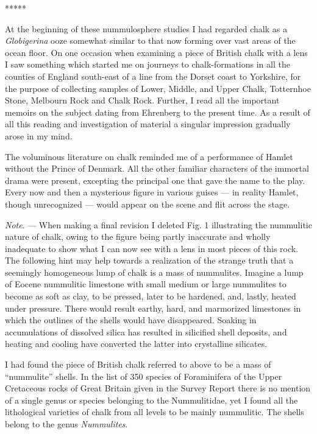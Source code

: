 \documentclass[a4paper, 12pt, oneside]{article}
\begin{document}
\centerline{*\hspace{15mm}*\hspace{15mm}*\hspace{15mm}*\hspace{15mm}*}
\bigskip

At the beginning of these nummulosphere studies I had regarded chalk as a \emph{Globigerina} ooze somewhat similar to that now forming over vast areas of the ocean floor. On one occasion when examining a piece of British chalk with a lens I saw something which started me on journeys to chalk-formations in all the counties of England south-east of a line from the Dorset coast to Yorkshire, for the purpose of collecting samples of Lower, Middle, and Upper Chalk, Totternhoe Stone, Melbourn Rock and Chalk Rock. Further, I read all the important memoirs on the subject dating from Ehrenberg to the present time. As a result of all this reading and investigation of material a singular impression gradually arose in my mind.

The voluminous literature on chalk reminded me of a performance of Hamlet without the Prince of Denmark. All the other familiar characters of the immortal drama were present, excepting the principal one that gave the name to the play. Every now and then a mysterious figure in various guises --- in reality Hamlet, though unrecognized --- would appear on the scene and flit across the stage.

\emph{Note}. --- When making a final revision I deleted Fig. 1 illustrating the nummulitic nature of chalk, owing to the figure being partly inaccurate and wholly inadequate to show what I can now see with a lens in most pieces of this rock. The following hint may help towards a realization of the strange truth that a seemingly homogeneous lump of chalk is a mass of nummulites. Imagine a lump of Eocene nummulitic limestone with small medium or large nummulites to become as soft as clay, to be pressed, later to be hardened, and, lastly, heated under pressure. There would result earthy, hard, and marmorized limestones in which the outlines of the shells would have disappeared. Soaking in accumulations of dissolved silica has resulted in silicified shell deposits, and heating and cooling have converted the latter into crystalline silicates.

I had found the piece of British chalk referred to above to be a mass of ``nummulite'' shells. In the list of 350 species of Foraminifera of the Upper Cretaceous rocks of Great Britain given in the Survey Report there is no mention of a single genus or species belonging to the Nummulitidae, yet I found all the lithological varieties of chalk from all levels to be mainly nummulitic. The shells belong to the genus \emph{Nummulites}.
\end{document}
